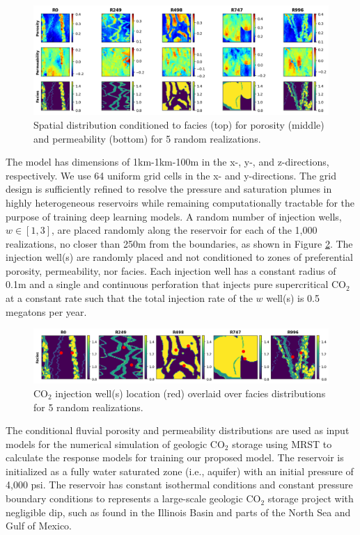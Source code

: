 \documentclass[10pt, twoside]{article}
\begin{document}
\begin{figure}[t]
    \centering
    \includegraphics[width=\textwidth]{figures/conditioned_geomodels.png}
    \caption{Spatial distribution conditioned to facies (top) for porosity (middle) and permeability (bottom) for 5 random realizations.}
    \label{conditioned_geomodels}
\end{figure}

The model has dimensions of 1km-1km-100m in the x-, y-, and z-directions, respectively. We use 64 uniform grid cells in the x- and y-directions. The grid design is sufficiently refined to resolve the pressure and saturation plumes in highly heterogeneous reservoirs while remaining computationally tractable for the purpose of training deep learning models. A random number of injection wells, $w \in [1,3]$, are placed randomly along the reservoir for each of the 1,000 realizations, no closer than 250m from the boundaries, as shown in Figure \ref{wells_dist}. The injection well(s) are randomly placed and not conditioned to zones of preferential porosity, permeability, nor facies. Each injection well has a constant radius of 0.1m and a single and continuous perforation that injects pure supercritical CO$_2$ at a constant rate such that the total injection rate of the $w$ well(s) is 0.5 megatons per year.

\begin{figure}[t]
    \centering
    \includegraphics[width=\textwidth]{figures/wells_dist.png}
    \caption{CO$_2$ injection well(s) location (red) overlaid over facies distributions for 5 random realizations.}
    \label{wells_dist}
\end{figure}

The conditional fluvial porosity and permeability distributions are used as input models for the numerical simulation of geologic CO$_2$ storage using MRST \cite{MRST2019} to calculate the response models for training our proposed model. The reservoir is initialized as a fully water saturated zone (i.e., aquifer) with an initial pressure of 4,000 psi. The reservoir has constant isothermal conditions and constant pressure boundary conditions to represents a large-scale geologic CO$_2$ storage project with negligible dip, such as found in the Illinois Basin and parts of the North Sea and Gulf of Mexico. 
\end{document}
